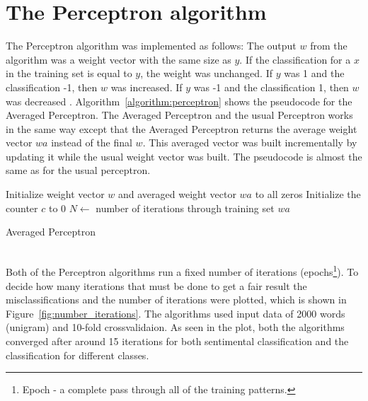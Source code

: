 \section{The Perceptron algorithm}
The Perceptron algorithm was implemented as follows:
The output $w$ from the algorithm was a weight vector with the same size as $y$. If the classification for a $x$ in the training set is equal to $y$, the weight was unchanged.
If $y$ was 1 and the classification -1, then $w$ was increased. If $y$ was -1 and the classification 1, then $w$ was decreased \citep{perceptron_ai}. Algorithm~\ref{algorithm:perceptron} shows the pseudocode for the Averaged Perceptron. The Averaged Perceptron and the usual Perceptron works in the same way except that the Averaged Perceptron returns the average weight vector $wa$ instead of the final $w$.
This averaged vector was built incrementally by updating it while the usual weight vector was built. The pseudocode is almost the same as for the usual perceptron.
\begin{algorithm}[h!]
 \SetAlgoLined
 Initialize weight vector $w$ and averaged weight vector $wa$ to all zeros\;
 Initialize the counter $c$ to 0\;
 $N \leftarrow$ number of iterations through training set\;
 \Return $wa$
 \caption{Averaged Perceptron}
 \label{algorithm:perceptron}
\end{algorithm} \\
Both of the Perceptron algorithms run a fixed number of iterations (epochs\footnote{Epoch - a complete pass through all of the training patterns.}). To decide how many iterations that must be done to get a fair result the misclassifications and the number of iterations were plotted, which is shown in Figure~\ref{fig:number_iterations}. The algorithms used input data of 2000 words (unigram) and 10-fold crossvalidaion. As seen in the plot, both the algorithms converged after around 15 iterations for both sentimental classification and the classification for different classes. \\

